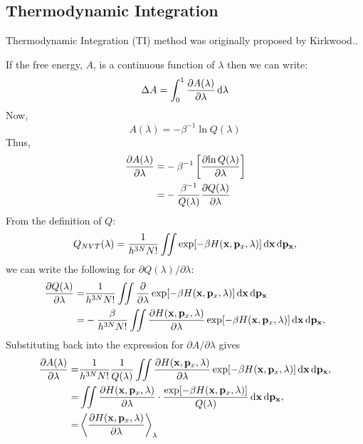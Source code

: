 \subsection{Thermodynamic Integration\label{Sec:FEM:TI}}
Thermodynamic Integration (TI) method was originally proposed by Kirkwood.\cite{KirkwoodJCP1935}. 
	
If the free energy, $A$, is a continuous function of $\lambda$ then we can write:
\begin{equation}
\Delta A = \int_{0}^{1} \frac{\partial{A(\lambda)}}{\partial{\lambda}} \mathop{}\!\mathrm{d}\lambda
\label{Eq:FEM:TI:deltaA1TI}
\end{equation} 
Now,
\begin{equation}
A(\lambda) = -\beta^{-1}\ln Q(\lambda)
\label{Eq:FEM:TI:Alambda}
\end{equation} 
Thus,
\begin{align}
\frac{\partial{A(\lambda)}}{\partial{\lambda}} =& -\beta^{-1} \left[ \frac{\partial{\ln{Q(\lambda)}}}{\partial{\lambda}} \right] \notag\\
=&-\frac{\beta^{-1}}{Q(\lambda)}\frac{\partial{Q(\lambda)}}{\partial{\lambda}}
\label{Eq:FEM:TI:deltaA2TI}
\end{align} 
From the definition of $Q$:
\begin{equation}
Q_{NVT}(\lambda) = \frac{1}{{h}^{3N}N!} \iint \exp[-\beta H(\mathbf{x},\mathbf{p}_{x},\lambda)] \mathop{}\!\mathrm{d}\mathbf{x}\mathop{}\!\mathrm{d}\mathbf{p}_\mathbf{x},
\label{Eq:FEM:TI:PFTI}
\end{equation}
we can write the following for $\partial{Q(\lambda)}/\partial{\lambda}$:
\begin{align}
\frac{\partial{Q(\lambda)}}{\partial{\lambda}} =&\frac{1}{{h}^{3N}N!} \iint \frac{\partial}{\partial{\lambda}}\exp[-\beta H(\mathbf{x},\mathbf{p}_{x},\lambda)] \mathop{}\!\mathrm{d}\mathbf{x}\mathop{}\!\mathrm{d}\mathbf{p}_\mathbf{x}\notag\\
=& -\frac{\beta}{{h}^{3N}N!} \iint \frac{\partial{H(\mathbf{x},\mathbf{p}_{x},\lambda)}}{\partial{\lambda}}\exp[-\beta H(\mathbf{x},\mathbf{p}_{x},\lambda)] \mathop{}\!\mathrm{d}\mathbf{x}\mathop{}\!\mathrm{d}\mathbf{p}_\mathbf{x},
\label{Eq:FEM:TI:PPF2}
\end{align}
Substituting back into the expression for $\partial{A}/\partial{\lambda}$ gives
\begin{align}
\frac{\partial{A(\lambda)}}{\partial{\lambda}} =& \frac{1}{{h}^{3N}N!}\frac{1}{Q(\lambda)} \iint \frac{\partial{H(\mathbf{x},\mathbf{p}_{x},\lambda)}}{\partial{\lambda}}\exp[-\beta H(\mathbf{x},\mathbf{p}_{x},\lambda)] \mathop{}\!\mathrm{d}\mathbf{x}\mathop{}\!\mathrm{d}\mathbf{p}_\mathbf{x}, \notag\\
=& \iint \frac{\partial{H(\mathbf{x},\mathbf{p}_{x},\lambda)}}{\partial{\lambda}}\cdot\frac{\exp[-\beta H(\mathbf{x},\mathbf{p}_{x},\lambda)]}{Q(\lambda)} \mathop{}\!\mathrm{d}\mathbf{x}\mathop{}\!\mathrm{d}\mathbf{p}_\mathbf{x},\notag \\
=& \left \langle \frac{\partial{H(\mathbf{x},\mathbf{p}_{x}, \lambda)}}{\partial{\lambda}} \right \rangle_{\lambda}
\label{Eq:FEM:TI:PA2}
\end{align}
